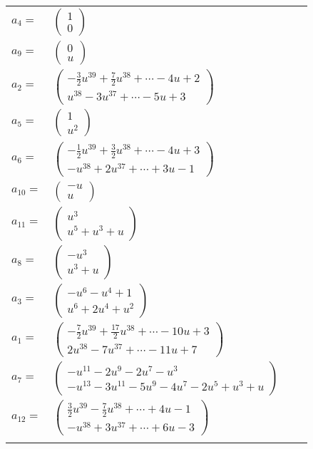 \documentclass[1p]{elsarticle_modified}
\theoremstyle{definition}
\begin{document}
\begin{tabular}{m{7pt} m{180pt} m{7pt} m{180pt} }
\flushright $a_{4}=$&$\begin{pmatrix}1\\0\end{pmatrix}$ \\
\flushright $a_{9}=$&$\begin{pmatrix}0\\u\end{pmatrix}$ \\
\flushright $a_{2}=$&$\begin{pmatrix}-\frac{3}{2} u^{39}+\frac{7}{2} u^{38}+\cdots-4 u+2\\u^{38}-3 u^{37}+\cdots-5 u+3\end{pmatrix}$ \\
\flushright $a_{5}=$&$\begin{pmatrix}1\\u^2\end{pmatrix}$ \\
\flushright $a_{6}=$&$\begin{pmatrix}-\frac{1}{2} u^{39}+\frac{3}{2} u^{38}+\cdots-4 u+3\\- u^{38}+2 u^{37}+\cdots+3 u-1\end{pmatrix}$ \\
\flushright $a_{10}=$&$\begin{pmatrix}- u\\u\end{pmatrix}$ \\
\flushright $a_{11}=$&$\begin{pmatrix}u^3\\u^5+u^3+u\end{pmatrix}$ \\
\flushright $a_{8}=$&$\begin{pmatrix}- u^3\\u^3+u\end{pmatrix}$ \\
\flushright $a_{3}=$&$\begin{pmatrix}- u^6- u^4+1\\u^6+2 u^4+u^2\end{pmatrix}$ \\
\flushright $a_{1}=$&$\begin{pmatrix}-\frac{7}{2} u^{39}+\frac{17}{2} u^{38}+\cdots-10 u+3\\2 u^{38}-7 u^{37}+\cdots-11 u+7\end{pmatrix}$ \\
\flushright $a_{7}=$&$\begin{pmatrix}- u^{11}-2 u^9-2 u^7- u^3\\- u^{13}-3 u^{11}-5 u^9-4 u^7-2 u^5+u^3+u\end{pmatrix}$ \\
\flushright $a_{12}=$&$\begin{pmatrix}\frac{3}{2} u^{39}-\frac{7}{2} u^{38}+\cdots+4 u-1\\- u^{38}+3 u^{37}+\cdots+6 u-3\end{pmatrix}$\\&\end{tabular}
\end{document}
